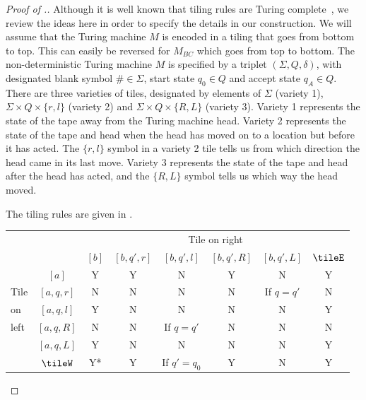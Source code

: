 \begin{proof}[Proof of .]
Although it is well known that tiling rules are Turing complete~\cite{kmw62},
we review the ideas here in order to specify the details in our
construction. We will assume that the Turing machine $M$ is encoded
in a tiling that goes from bottom to top. This can easily be reversed for
$M_{BC}$ which goes from top to bottom.
The non-deterministic Turing machine $M$ is specified by
a triplet $(\Sigma, Q, \delta)$, with
designated blank symbol $\# \in \Sigma$, start state $q_0 \in Q$ and
accept state $q_A \in Q$.
There are three varieties of tiles, designated by elements of
$\Sigma$ (variety 1), $\Sigma \times Q \times \{r,l\}$ (variety 2) and
$\Sigma \times Q \times \{R,L\}$ (variety 3).  Variety 1 represents the state of the tape away from the Turing machine head.  Variety 2 represents the
state of the tape and head when the head has moved on to a location but before it has acted.  The $\{r, l\}$ symbol in a variety 2 tile tells us from which direction the head came in its last move.  Variety 3 represents the state of the tape and head after
the head has acted, and the $\{R,L\}$ symbol tells us which way the head moved.

The tiling rules are given in .
%
\begin{table}
\begin{centering}
\begin{tabular}{lc|cccccc}
     &             &                \multicolumn{6}{c}{Tile on right} \\
     &             & $[b]$ & $[b,q',r]$ & $[b,q',l]$ & $[b,q',R]$ & $[b,q',L]$ & $\tileE$ \\
 \hline
     & $[a]$       &   Y   &     Y      &      N     &      Y     &     N      &   Y     \\
Tile & $[a,q,r]$   &   N   &     N      &      N     &      N     & If $q=q'$  &   N     \\
on   & $[a,q,l]$   &   Y   &     N      &      N     &      N     &     N      &   Y     \\
left & $[a,q,R]$   &   N   &     N      & If $q=q'$  &      N     &     N      &   N     \\
     & $[a,q,L]$   &   Y   &     N      &      N     &      N     &     N      &   Y     \\
     & $\tileW$    &   Y*  &     Y     & If $q'=q_0$ &      Y     &     N      &   Y     \\
\end{tabular}


\end{centering}
\end{table}
\end{proof}
